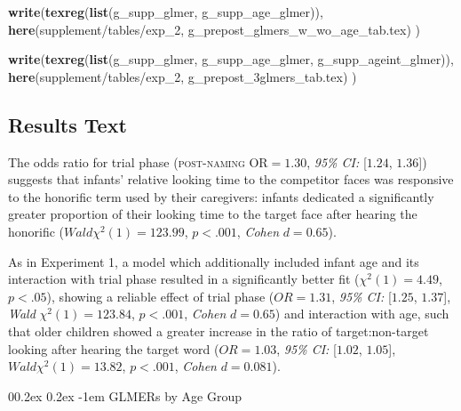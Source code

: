 \documentclass[
  doc,floatsintext]{apa6}
\makeatletter
\newenvironment{Shaded}{\begin{snugshade}}{\end{snugshade}}
\newcommand{\FunctionTok}[1]{\textcolor[rgb]{0.13,0.29,0.53}{\textbf{#1}}}
\newcommand{\NormalTok}[1]{#1}
\newcommand{\StringTok}[1]{\textcolor[rgb]{0.31,0.60,0.02}{#1}}
\let\oldparagraph\paragraph
\renewcommand{\paragraph}{
    \@ifstar
      \xxxParagraphStar
      \xxxParagraphNoStar
  }
\newcommand{\xxxParagraphStar}[1]{\oldparagraph*{#1}\mbox{}}
\newcommand{\xxxParagraphNoStar}[1]{\oldparagraph{#1}\mbox{}}
\renewcommand{\paragraph}{\@startsection{paragraph}{4}{\parindent}%
  {0\baselineskip \@plus 0.2ex \@minus 0.2ex}%
  {-1em}%
  {\normalfont\normalsize\bfseries\itshape\typesectitle}}
\makeatother
\begin{document}
\begin{Shaded}
\begin{Highlighting}[]
\FunctionTok{write}\NormalTok{(}\FunctionTok{texreg}\NormalTok{(}\FunctionTok{list}\NormalTok{(g\_supp\_glmer, g\_supp\_age\_glmer)), }
      \FunctionTok{here}\NormalTok{(}\StringTok{\textquotesingle{}supplement/tables/exp\_2\textquotesingle{}}\NormalTok{, }\StringTok{\textquotesingle{}g\_prepost\_glmers\_w\_wo\_age\_tab.tex\textquotesingle{}}\NormalTok{)}
\NormalTok{      )}

\FunctionTok{write}\NormalTok{(}\FunctionTok{texreg}\NormalTok{(}\FunctionTok{list}\NormalTok{(g\_supp\_glmer, g\_supp\_age\_glmer, g\_supp\_ageint\_glmer)),}
      \FunctionTok{here}\NormalTok{(}\StringTok{\textquotesingle{}supplement/tables/exp\_2\textquotesingle{}}\NormalTok{, }\StringTok{\textquotesingle{}g\_prepost\_3glmers\_tab.tex\textquotesingle{}}\NormalTok{)}
\NormalTok{      )}
\end{Highlighting}
\end{Shaded}

\subsection{Results Text}\label{results-text}

The odds ratio for trial phase (\textsc{post-naming} OR\(=1.30\), \textit{95\% CI:} {[}\(1.24\), \(1.36\){]}) suggests that infants' relative looking time to the competitor faces was responsive to the honorific term used by their caregivers: infants dedicated a significantly greater proportion of their looking time to the target face after hearing the honorific (\(Wald \chi^2(1)=123.99\), \(p<.001\), \textit{Cohen} \(d=0.65\)).

As in Experiment 1, a model which additionally included infant age and its interaction with trial phase resulted in a significantly better fit (\(\chi^2(1)=4.49\), \(p<.05\)), showing a reliable effect of trial phase (\(OR=1.31\), \textit{95\% CI:} {[}\(1.25\), \(1.37\){]}, \textit{Wald} \(\chi^2(1)=123.84\), \(p<.001\), \textit{Cohen} \(d=0.65\)) and interaction with age, such that older children showed a greater increase in the ratio of target:non-target looking after hearing the target word (\(OR=1.03\), \textit{95\% CI:} {[}\(1.02\), \(1.05\){]}, \(Wald \chi^2(1)=13.82\), \(p<.001\), \textit{Cohen} \(d=0.081\)).

\paragraph{GLMERs by Age Group}\label{glmers-by-age-group}
\end{document}
